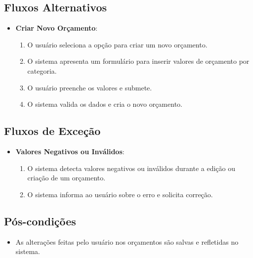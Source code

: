 \subsection*{Fluxos Alternativos}
\begin{addmargin}[1.5cm]{0cm}
    \begin{itemize}
        \item \textbf{Criar Novo Orçamento}:
        \begin{enumerate}
            \item O usuário seleciona a opção para criar um novo orçamento.
            \item O sistema apresenta um formulário para inserir valores de orçamento por categoria.
            \item O usuário preenche os valores e submete.
            \item O sistema valida os dados e cria o novo orçamento.
        \end{enumerate}
    \end{itemize}
\end{addmargin}

\subsection*{Fluxos de Exceção}
\begin{addmargin}[1.5cm]{0cm}
    \begin{itemize}
        \item \textbf{Valores Negativos ou Inválidos}:
        \begin{enumerate}
            \item O sistema detecta valores negativos ou inválidos durante a edição ou criação de um orçamento.
            \item O sistema informa ao usuário sobre o erro e solicita correção.
        \end{enumerate}
    \end{itemize}
\end{addmargin}

\subsection*{Pós-condições}
\begin{addmargin}[1.5cm]{0cm}
    \begin{itemize}
        \item As alterações feitas pelo usuário nos orçamentos são salvas e refletidas no sistema.
    \end{itemize}
\end{addmargin}


